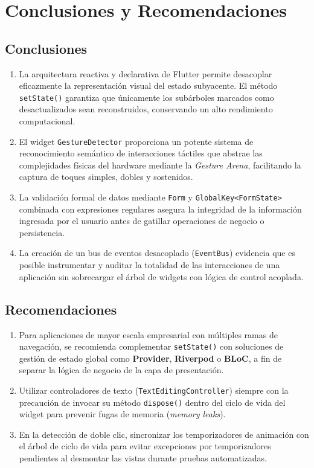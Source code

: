\documentclass[12pt,a4paper]{article}
\begin{document}
  \section{Conclusiones y Recomendaciones}

  \subsection{Conclusiones}
  \begin{enumerate}[leftmargin=*]
      \item La arquitectura reactiva y declarativa de Flutter permite desacoplar eficazmente la representación visual del estado subyacente. El método \texttt{setState()} garantiza que únicamente los subárboles marcados como desactualizados sean reconstruidos, conservando un alto rendimiento computacional.
      \item El widget \texttt{GestureDetector} proporciona un potente sistema de reconocimiento semántico de interacciones táctiles que abstrae las complejidades físicas del hardware mediante la \textit{Gesture Arena}, facilitando la captura de toques simples, dobles y sostenidos.
      \item La validación formal de datos mediante \texttt{Form} y \texttt{GlobalKey<FormState>} combinada con expresiones regulares asegura la integridad de la información ingresada por el usuario antes de gatillar operaciones de negocio o persistencia.
      \item La creación de un bus de eventos desacoplado (\texttt{EventBus}) evidencia que es posible instrumentar y auditar la totalidad de las interacciones de una aplicación sin sobrecargar el árbol de widgets con lógica de control acoplada.
  \end{enumerate}

  \subsection{Recomendaciones}
  \begin{enumerate}[leftmargin=*]
      \item Para aplicaciones de mayor escala empresarial con múltiples ramas de navegación, se recomienda complementar \texttt{setState()} con soluciones de gestión de estado global como \textbf{Provider}, \textbf{Riverpod} o \textbf{BLoC}, a fin de separar la lógica de negocio de la capa de presentación.
      \item Utilizar controladores de texto (\texttt{TextEditingController}) siempre con la precaución de invocar su método \texttt{dispose()} dentro del ciclo de vida del widget para prevenir fugas de memoria (\textit{memory leaks}).
      \item En la detección de doble clic, sincronizar los temporizadores de animación con el árbol de ciclo de vida para evitar excepciones por temporizadores pendientes al desmontar las vistas durante pruebas automatizadas.
  \end{enumerate}
\end{document}
